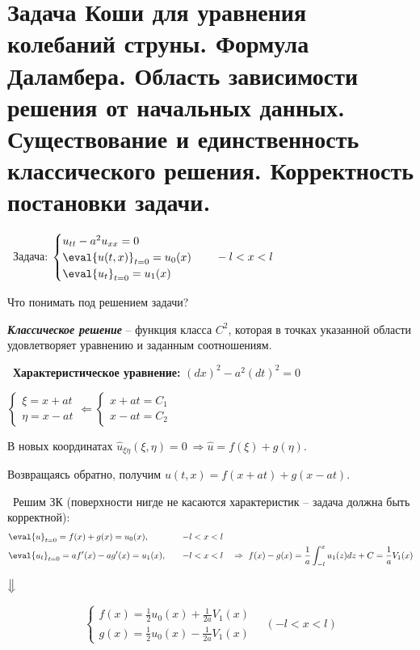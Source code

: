\documentclass[../main.tex]{subfiles}
\begin{document}
  
\section[Задача Коши для колебаний струны]{Задача Коши для уравнения колебаний струны. Формула Даламбера. Область зависимости решения от начальных данных. Существование и единственность классического решения. Корректность постановки задачи.}
\textbullet\ Задача: \quad $\begin{cases} u_{tt}-a^2u_{xx} = 0\\ \eval{u(t,x)}_{t=0} = u_0(x)\\ \eval{u_t}_{t=0} = u_1(x)\end{cases}\quad -l<x<l$
\vspace{0.5em}

Что понимать под решением задачи?

\begin{definition} \textbf{\emph{Классическое решение}} -- функция класса $C^2$, которая в точках указанной области удовлетворяет уравнению и заданным соотношениям.
\end{definition}

\textbullet\ {\bf Характеристическое уравнение: } $(dx)^2 - a^2(dt)^2 = 0$

$\begin{cases} \xi = x+at \\ \eta = x-at \end{cases} \Leftarrow \begin{cases} x+at = C_1 \\ x-at = C_2 \end{cases}$

В новых координатах $\hat{u}_{\xi\eta}(\xi,\eta) = 0\ \Rightarrow \hat{u} = f(\xi) + g(\eta) $.

Возвращаясь обратно, получим $u(t,x) = f(x+at) + g(x-at)$.
\vspace{0.4em}

\textbullet\ Решим ЗК (поверхности нигде не касаются характеристик -- задача должна быть корректной):
\begin{equation*}
\begin{aligned}
&\eval{u}_{t=0} = f(x) + g(x) = u_0(x), \quad &-l < x< l&\\
&\eval{u_t}_{t=0} =  af'(x) - ag'(x) = u_1(x), \quad &-l < x < l& \quad \Rightarrow\ f(x) - g(x) = \frac1{a}\int _{-l}^xu_1(z)dz + C = \frac1{a}V_1(x)
\end{aligned}
\end{equation*}
\begin{center}
$\big\Downarrow$
\end{center}
\begin{equation}
\label{eq::3::dalam}
\tag{*}
\begin{cases} f(x) = \frac1{2}u_0(x) + \frac1{2a}V_1(x) \\ g(x) = \frac1{2}u_0(x) - \frac1{2a}V_1(x) \end{cases} \quad (-l < x< l)
\end{equation}
\end{document}
